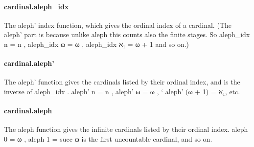 \documentclass{article}
\begin{document}
\paragraph{cardinal.aleph\_idx}
\par
The 
\colorbox[RGB]{253,246,227}{{{{\color[RGB]{101, 123, 131} aleph' }}}} index function, which gives the ordinal index of a cardinal.
(The 
\colorbox[RGB]{253,246,227}{{{{\color[RGB]{101, 123, 131} aleph' }}}} part is because unlike 
\colorbox[RGB]{253,246,227}{{{{\color[RGB]{101, 123, 131} aleph }}}} this counts also the
finite stages. So 
\colorbox[RGB]{253,246,227}{{{{\color[RGB]{101, 123, 131} aleph\_idx n  }}}{{{\color[RGB]{181, 137, 0} = }}}{{{\color[RGB]{101, 123, 131}  n }}}}, 
\colorbox[RGB]{253,246,227}{{{{\color[RGB]{101, 123, 131} aleph\_idx ω  }}}{{{\color[RGB]{181, 137, 0} = }}}{{{\color[RGB]{101, 123, 131}  ω }}}},
\colorbox[RGB]{253,246,227}{{{{\color[RGB]{101, 123, 131} aleph\_idx ℵ₁  }}}{{{\color[RGB]{181, 137, 0} = }}}{{{\color[RGB]{101, 123, 131}  ω  }}}{{{\color[RGB]{181, 137, 0} + }}}{{{\color[RGB]{101, 123, 131}   }}}{{{\color[RGB]{108, 113, 196} 1 }}}} and so on.)
\paragraph{cardinal.aleph'}
\par
The 
\colorbox[RGB]{253,246,227}{{{{\color[RGB]{101, 123, 131} aleph' }}}} function gives the cardinals listed by their ordinal
index, and is the inverse of 
\colorbox[RGB]{253,246,227}{{{{\color[RGB]{101, 123, 131} aleph\_idx }}}}.
\colorbox[RGB]{253,246,227}{{{{\color[RGB]{101, 123, 131} aleph' n  }}}{{{\color[RGB]{181, 137, 0} = }}}{{{\color[RGB]{101, 123, 131}  n }}}}, 
\colorbox[RGB]{253,246,227}{{{{\color[RGB]{101, 123, 131} aleph' ω  }}}{{{\color[RGB]{181, 137, 0} = }}}{{{\color[RGB]{101, 123, 131}  ω }}}}, 
`
aleph' (ω + 1) = ℵ₁, etc.
\paragraph{cardinal.aleph}
\par
The 
\colorbox[RGB]{253,246,227}{{{{\color[RGB]{101, 123, 131} aleph }}}} function gives the infinite cardinals listed by their
ordinal index. 
\colorbox[RGB]{253,246,227}{{{{\color[RGB]{101, 123, 131} aleph  }}}{{{\color[RGB]{108, 113, 196} 0 }}}{{{\color[RGB]{101, 123, 131}   }}}{{{\color[RGB]{181, 137, 0} = }}}{{{\color[RGB]{101, 123, 131}  ω }}}}, 
\colorbox[RGB]{253,246,227}{{{{\color[RGB]{101, 123, 131} aleph  }}}{{{\color[RGB]{108, 113, 196} 1 }}}{{{\color[RGB]{101, 123, 131}   }}}{{{\color[RGB]{181, 137, 0} = }}}{{{\color[RGB]{101, 123, 131}  succ ω }}}} is the first
uncountable cardinal, and so on.
\end{document}
